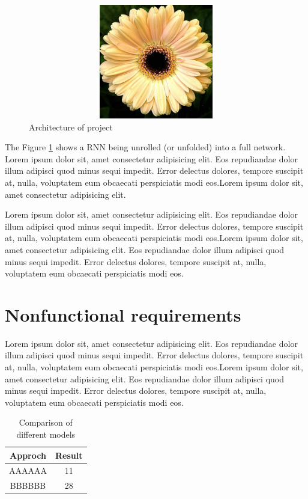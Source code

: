 \begin{figure}[h]
\begin{center}
     \includegraphics[width=13cm,height=5cm]{img/daisy}
     \caption[Architecture of project]{Architecture of project}
     \label{rnn}
\end{center}
\end{figure}
The Figure \ref{rnn} shows a RNN being unrolled (or unfolded) into a full network. Lorem ipsum dolor sit, amet consectetur adipisicing elit. Eos repudiandae dolor illum adipisci quod minus sequi impedit. Error delectus dolores, tempore suscipit at, nulla, voluptatem eum obcaecati perspiciatis modi eos.Lorem ipsum dolor sit, amet consectetur adipisicing elit.

Lorem ipsum dolor sit, amet consectetur adipisicing elit. Eos repudiandae dolor illum adipisci quod minus sequi impedit. Error delectus dolores, tempore suscipit at, nulla, voluptatem eum obcaecati perspiciatis modi eos.Lorem ipsum dolor sit, amet consectetur adipisicing elit. Eos repudiandae dolor illum adipisci quod minus sequi impedit. Error delectus dolores, tempore suscipit at, nulla, voluptatem eum obcaecati perspiciatis modi eos. 

\section{Nonfunctional requirements}

Lorem ipsum dolor sit, amet consectetur adipisicing elit. Eos repudiandae dolor illum adipisci quod minus sequi impedit. Error delectus dolores, tempore suscipit at, nulla, voluptatem eum obcaecati perspiciatis modi eos.Lorem ipsum dolor sit, amet consectetur adipisicing elit. Eos repudiandae dolor illum adipisci quod minus sequi impedit. Error delectus dolores, tempore suscipit at, nulla, voluptatem eum obcaecati perspiciatis modi eos.
\begin{table}[H]
\caption{Comparison of different models}
\label{imagecaptioncompare}
\begin{centering}
\begin{tabular}{|c|c|}
\hline
\textbf{Approch} & \textbf{Result}\tabularnewline
\hline
\hline
AAAAAA & 11\tabularnewline
\hline
BBBBBB  & 28\tabularnewline
\hline
\end{tabular}
\par\end{centering}

\end{table}

